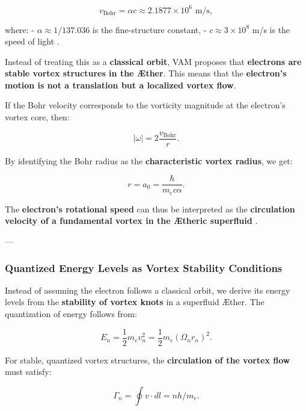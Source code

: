 \begin{equation*}
    v_{\text{Bohr}} = \alpha c \approx 2.1877 \times 10^6 \text{ m/s},
\end{equation*}

where:
- \( \alpha \approx 1/137.036 \) is the fine-structure constant,
- \( c \approx 3 \times 10^8 \) m/s is the speed of light \cite{bohr_atom, bethe_qmech}.

Instead of treating this as a \textbf{classical orbit}, VAM proposes that \textbf{electrons are stable vortex structures in the Æther}. This means that the \textbf{electron’s motion is not a translation but a localized vortex flow}.

If the Bohr velocity corresponds to the vorticity magnitude at the electron’s vortex core, then:

\begin{equation*}
    |\omega| = 2 \frac{v_{\text{Bohr}}}{r}.
\end{equation*}

By identifying the Bohr radius as the \textbf{characteristic vortex radius}, we get:

\begin{equation*}
    r = a_0 = \frac{\hbar}{m_e c \alpha}.
\end{equation*}

The \textbf{electron’s rotational speed} can thus be interpreted as the \textbf{circulation velocity of a fundamental vortex in the Ætheric superfluid} \cite{onsager_superfluid, feynman_superfluid}.

---

\subsubsection*{Quantized Energy Levels as Vortex Stability Conditions}

Instead of assuming the electron follows a classical orbit, we derive its energy levels from the \textbf{stability of vortex knots} in a superfluid Æther. The quantization of energy follows from:

\begin{equation*}
    E_n = \frac{1}{2} m_e v_n^2 = \frac{1}{2} m_e (\Omega_n r_n)^2.
\end{equation*}

For stable, quantized vortex structures, the \textbf{circulation of the vortex flow} must satisfy:

\begin{equation*}
    \Gamma_n = \oint v \cdot dl = n h / m_e.
\end{equation*}

